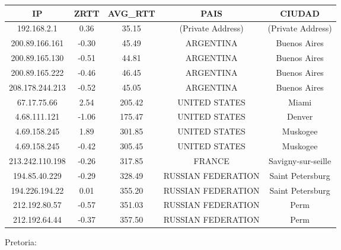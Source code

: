 \begin{tabular}{|c@{\hspace{5ex}}c@{\hspace{5ex}}c@{\hspace{5ex}}c@{\hspace{5ex}}c|}
 \hline
 \rule{0pt}{1.2em}IP & ZRTT & AVG\_RTT & PAIS & CIUDAD\\[0.2em]
 \hline

\rule{0pt}{1.2em} 192.168.2.1  &  0.36 & 35.15 & (Private Address) & (Private Address) \\[0.2em]
\rule{0pt}{1.2em} 200.89.166.161  &  -0.30 & 45.49 & ARGENTINA & Buenos Aires \\[0.2em]
\rule{0pt}{1.2em} 200.89.165.130  &  -0.51 & 44.81 & ARGENTINA & Buenos Aires \\[0.2em]
\rule{0pt}{1.2em} 200.89.165.222  &  -0.46 & 46.45 & ARGENTINA & Buenos Aires \\[0.2em]
\rule{0pt}{1.2em} 208.178.244.213  &  -0.52 & 45.05 & ARGENTINA & Buenos Aires \\[0.2em]
\rule{0pt}{1.2em} 67.17.75.66  &  2.54 & 205.42 & UNITED STATES & Miami \\[0.2em]
\rule{0pt}{1.2em} 4.68.111.121  &  -1.06 & 175.47 & UNITED STATES & Denver \\[0.2em]
\rule{0pt}{1.2em} 4.69.158.245  &  1.89 & 301.85 & UNITED STATES & Muskogee \\[0.2em]
\rule{0pt}{1.2em} 4.69.158.245  &  -0.42 & 305.45 & UNITED STATES & Muskogee \\[0.2em]
\rule{0pt}{1.2em} 213.242.110.198  &  -0.26 & 317.85 & FRANCE & Savigny-sur-seille \\[0.2em]
\rule{0pt}{1.2em} 194.85.40.229  &  -0.29 & 328.49 & RUSSIAN FEDERATION & Saint Petersburg \\[0.2em]
\rule{0pt}{1.2em} 194.226.194.22  &  0.01 & 355.20 & RUSSIAN FEDERATION & Saint Petersburg \\[0.2em]
\rule{0pt}{1.2em} 212.192.80.57  &  -0.57 & 351.03 & RUSSIAN FEDERATION & Perm \\[0.2em]
\rule{0pt}{1.2em} 212.192.64.44  &  -0.37 & 357.50 & RUSSIAN FEDERATION & Perm \\[0.2em]
\hline
 \end{tabular}

Pretoria:

